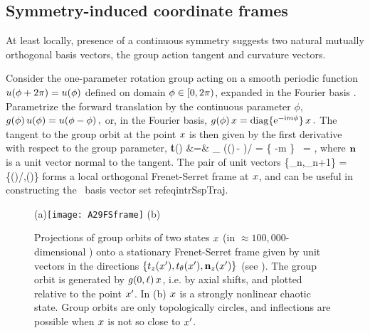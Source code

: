 \subsection{Symmetry-induced coordinate frames}
\label{s:symmIndCoo}

At least locally, presence of a continuous symmetry suggests two
natural mutually orthogonal basis vectors, the group action tangent and
curvature vectors.

Consider the one-parameter rotation group  acting on a smooth
periodic function $u({\bf \phi} + 2\pi) = u({\bf \phi})$ defined on domain
${\bf \phi} \in [0,2\pi)$, expanded in the Fourier basis
.
Parametrize the forward
translation by the continuous parameter $\phi$,
\(
    g(\phi)\,u({\bf \phi}) = u({\bf \phi}-\phi)
\,,
\)
or, in the Fourier basis,
\(
   g(\phi) \,x = \mathrm{diag}\{ \mathrm{e}^{-\mathrm{i}m\phi} \} \,x
\,.
\)
The tangent to the group orbit at the point $\ssp$ is then given by
the first derivative with respect to the group parameter,
\bea
   {\bf t}(\ssp) &=&
   \lim_{\gSpace{}}
   \left(\LieEl(\gSpace)\,\ssp - \ssp\right)/\gSpace
   = \{ -m \} \, \ssp = \Lg \ssp,
\label{eq:tang}
\eea
where $\mathbf{n}$ is a unit vector normal to the tangent. The pair of unit vectors
    \PC{2011-10-28
    ``As $\Norm{\LieEl(\gSpace)\slicep}$ is a constant, for the group tangent
    vector $\Lg_\gSpace \slicep$ evaluated at $\slicep$ \refeq{eq:tang}
    $\braket{\slicep}{\Lg_\theta\,\slicep}$ vanishes ($\Lg_{\theta}$ is
    antisymmetric).''
The state vector $\ssp$ is not normal to \normVec(\ssp), as $\braket{\ssp
\Lg^2}{\ssp} = - \Norm{\groupTan(\ssp)}^2 \neq 0$, but can one use it to
produce from $\ssp$ the 3. local eigenbasis unit vector? Have not thought
that through. If we do that here, need to rewrite text leading to
\refeq{PCsectQ0}.
    }
\beq
\{{\be_n},{\be_{n+1}}\} =
\{\groupTan(\ssp)/\Norm{\groupTan(\ssp)},\normVec(\ssp)\}
forms a local orthogonal Frenet-Serret frame at $\ssp$, and can be useful
in constructing the \statesp\ basis vector set  refeq{intrSspTraj}.

\begin{figure}
  \centering
(a)\texttt{[image: A29FSframe]}
(b)%
  \caption{\label{fig:2840GOt135th0}
Projections of group orbits of two states $\ssp$ (in $\approx
100,000$-dimensional {\statesp}) onto a stationary Frenet-Serret frame
given by unit vectors in the directions
$\{t_z(x'),t_\theta(x'),\mathbf{n}_z(x')\}$ (see
). The group orbit is generated by
$g(0,\ell)\,x$, i.e. by axial shifts, and plotted relative to the
point $x'$.
In  (b) $\ssp$ is a strongly nonlinear chaotic state.
Group orbits are only topologically circles, and inflections are possible
when $\ssp$ is not so close to $x'$.
  }
\end{figure}

